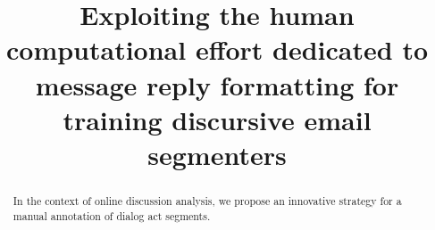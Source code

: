 \documentclass[11pt]{article}
\title{Exploiting the human computational effort dedicated to message reply formatting for training discursive email segmenters} %
\date{}
\author{}
\begin{document}
\maketitle

\begin{abstract}
In the context of online discussion analysis, we propose an innovative strategy for a manual annotation of dialog act segments.
\end{abstract}



%
% 
\blfootnote{
    \hspace{-0.65cm}  %
}

















\end{document}
